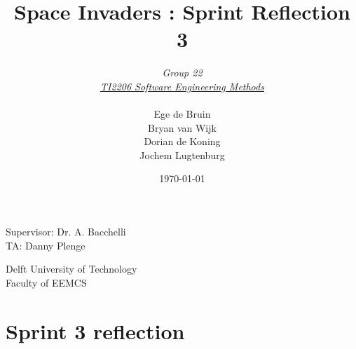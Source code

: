 \documentclass[10pt]{article}
\begin{document}
\title{Space Invaders : Sprint Reflection 3}
\date{\today}
\author{\textit{Group 22}\\ \textit{\underline{TI2206 Software Engineering Methods}} \\
 \\Ege de Bruin \\ Bryan van Wijk \\ Dorian de Koning \\ Jochem Lugtenburg }
 \maketitle  
 \begin{center}
Supervisor: Dr. A. Bacchelli\\
TA: Danny Plenge\\
 \end{center}     
 \begin{center}
 Delft University of Technology\\
 Faculty of EEMCS\\
 \end{center}
 \thispagestyle{empty}
 \pagebreak

\section*{Sprint 3 reflection}
\end{document}
